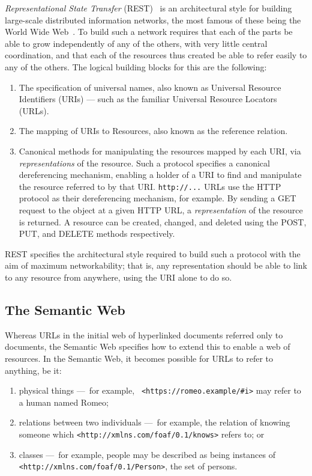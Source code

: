 \documentclass{llncs}
\begin{document}
{\em Representational State Transfer} (REST)~\cite[Chap.~5]{fielding2000phd}
is an architectural style for
building large-scale distributed information networks, the most famous
of these being the World Wide Web~\cite{WebArchVol1}.  To build such a
network requires that each of the parts be able to grow independently
of any of the others, with very little central coordination, and that
each of the resources thus created be able to refer easily to any of
the others.
%
The logical building blocks for this are the following:
\begin{enumerate}
\item The specification of universal names, also known as Universal
  Resource Identifiers (URIs) --- such as the familiar Universal Resource Locators (URLs).
\item The mapping of URIs to Resources, also known as the reference relation.
\item Canonical methods for manipulating the resources mapped by each
  URI, via {\em representations} of the resource.  Such a protocol
  specifies a canonical dereferencing mechanism, enabling a holder of
  a URI to find and manipulate the resource referred to by that URI.
  {\tt http://...} URLs use the HTTP protocol as their dereferencing
  mechanism, for example.  By sending a GET request to the object at a given HTTP
  URL, a  {\em
    representation} of the resource is returned.  A resource can
  be created,  changed, and deleted using the POST, PUT, and DELETE methods 
  respectively.
  \end{enumerate}

REST specifies the architectural style required to build such a
protocol with the aim of maximum networkability; that is, any
representation should be able to link to any resource from anywhere,
using the URI alone to do so.

\subsection{The Semantic Web}

Whereas URLs in the initial web of hyperlinked documents referred only
to documents, the Semantic Web specifies how to extend this to enable
a web of resources. In the Semantic Web, it becomes
possible for URLs to refer to anything, be it:
\begin{enumerate}
\item physical things ---~for example, {\tt
  <https://romeo.example/\#i>}
may refer to a human named Romeo;
\item relations between two individuals ---~for example, the relation of
  knowing someone which {\tt <http://xmlns.com/foaf/0.1/knows>} refers
  to; or
\item classes ---~for example, people may be described as being instances of {\tt
  <http://xmlns.com/foaf/0.1/Person>}, the set of persons.
\end{enumerate}
\end{document}
